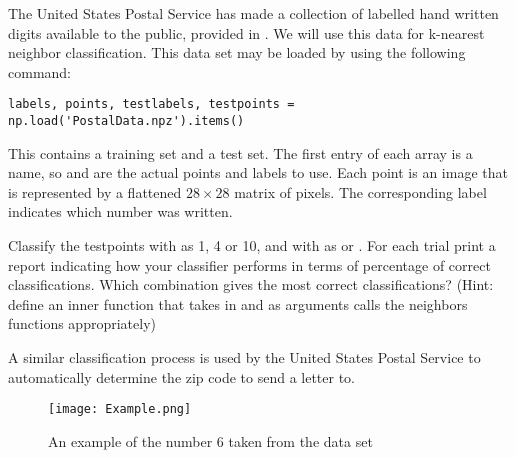 \begin{problem}
The United States Postal Service has made a collection of labelled hand written digits available to the public, provided in .
We will use this data for k-nearest neighbor classification.
This data set may be loaded by using the following command:
\begin{lstlisting}
labels, points, testlabels, testpoints = np.load('PostalData.npz').items()
\end{lstlisting}
This contains a training set and a test set.
The first entry of each array is a name, so  and  are the actual points and labels to use.
Each point is an image that is represented by a flattened $28 \times 28$ matrix of pixels. 
The corresponding label indicates which number was written.

Classify the testpoints with  as 1, 4 or 10, and with  as  or .
For each trial print a report indicating how your classifier performs in terms of percentage of correct classifications.
Which combination gives the most correct classifications?
(Hint: define an inner function that takes in  and  as arguments calls the neighbors functions appropriately)

A similar classification process is used by the United States Postal Service to automatically determine the zip code to send a letter to.

\begin{figure}[H]
\texttt{[image: Example.png]}
\caption{An example of the number 6 taken from the data set}
\end{figure}
\end{problem}
